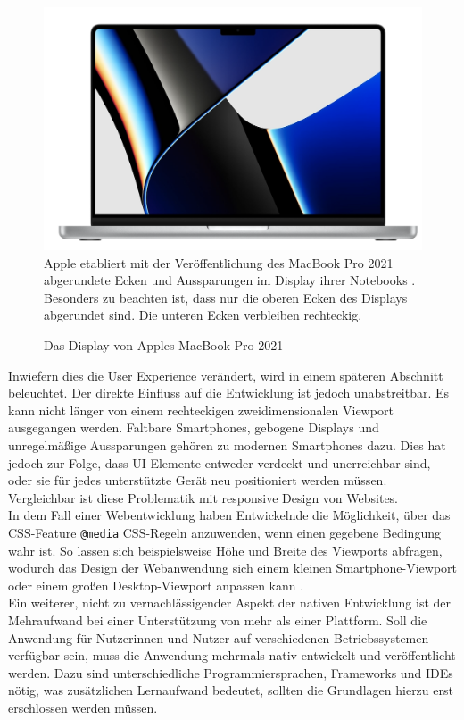 \documentclass[a4paper]{scrartcl}
\begin{document}
\begin{figure}[H]
	\centering
	\caption{Das Display von Apples MacBook Pro 2021}
	\includegraphics[scale=0.25]{_assets/macbook_display.png} \\
	Apple etabliert mit der Veröffentlichung des MacBook Pro 2021 abgerundete Ecken und Aussparungen im Display ihrer Notebooks \autocite{Macbook_Display}. Besonders zu beachten ist, dass nur die oberen Ecken des Displays abgerundet sind. Die unteren Ecken verbleiben rechteckig.
\end{figure}

Inwiefern dies die User Experience verändert, wird in einem späteren Abschnitt beleuchtet. Der direkte Einfluss auf die Entwicklung ist jedoch unabstreitbar. Es kann nicht länger von einem rechteckigen zweidimensionalen Viewport ausgegangen werden. Faltbare Smartphones, gebogene Displays und unregelmäßige Aussparungen gehören zu modernen Smartphones dazu. Dies hat jedoch zur Folge, dass UI-Elemente entweder verdeckt und unerreichbar sind, oder sie für jedes unterstützte Gerät neu positioniert werden müssen. Vergleichbar ist diese Problematik mit responsive Design von Websites. \\
In dem Fall einer Webentwicklung haben Entwickelnde die Möglichkeit, über das CSS-Feature \texttt{@media} CSS-Regeln anzuwenden, wenn einen gegebene Bedingung wahr ist. So lassen sich beispielsweise Höhe und Breite des Viewports abfragen, wodurch das Design der Webanwendung sich einem kleinen Smartphone-Viewport oder einem großen Desktop-Viewport anpassen kann \autocite{Media_Queries}. \\

Ein weiterer, nicht zu vernachlässigender Aspekt der nativen Entwicklung ist der Mehraufwand bei einer Unterstützung von mehr als einer Plattform. Soll die Anwendung für Nutzerinnen und Nutzer auf verschiedenen Betriebssystemen verfügbar sein, muss die Anwendung mehrmals nativ entwickelt und veröffentlicht werden. Dazu sind unterschiedliche Programmiersprachen, Frameworks und IDEs nötig, was zusätzlichen Lernaufwand bedeutet, sollten die Grundlagen hierzu erst erschlossen werden müssen. \\
\end{document}
